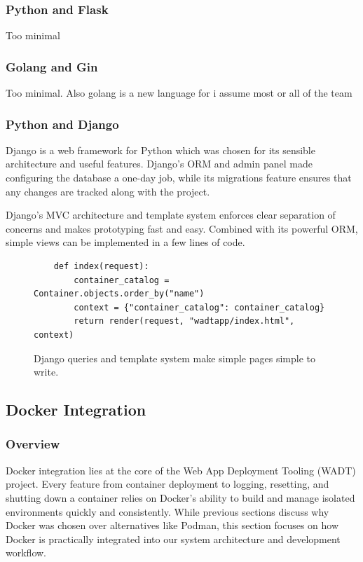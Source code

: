 \documentclass[12pt]{article}
\begin{document}
\subsubsection{Python and Flask}
Too minimal

\subsubsection{Golang and Gin}
Too minimal. Also golang is a new language for i assume most or all of the team

\subsubsection{Python and Django}
Django is a web framework for Python which was chosen for its sensible architecture and useful features. Django's ORM and admin panel made configuring the database a one-day job, while its migrations feature ensures that any changes are tracked along with the project.

Django's MVC architecture and template system enforces clear separation of concerns and makes prototyping fast and easy. Combined with its powerful ORM, simple views can be implemented in a few lines of code.
\begin{figure}[H]
	\centering
	\begin{verbatim}
	def index(request):
	    container_catalog = Container.objects.order_by("name")
	    context = {"container_catalog": container_catalog}
	    return render(request, "wadtapp/index.html", context)
	\end{verbatim}
	\caption{Django queries and template system make simple pages simple to write.}
	\label{fig:indexview}
\end{figure}

\subsection{Docker Integration}

\subsubsection{Overview}
Docker integration lies at the core of the Web App Deployment Tooling (WADT) project. Every feature from container deployment to logging, resetting, and shutting down a container relies on Docker’s ability to build and manage isolated environments quickly and consistently. While previous sections discuss why Docker was chosen over alternatives like Podman, this section focuses on how Docker is practically integrated into our system architecture and development workflow.
\end{document}
